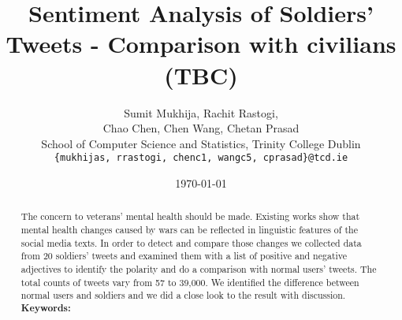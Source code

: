 \documentclass[english,a4paper,11pt]{article}
\title{Sentiment Analysis of Soldiers' Tweets - Comparison with civilians (TBC)}
\date{\today}
\author{
  Sumit Mukhija, Rachit Rastogi,\\
  Chao Chen, Chen Wang, Chetan Prasad\\
  School of Computer Science and Statistics, Trinity College Dublin\\
  \texttt{\{mukhijas, rrastogi, chenc1, wangc5, cprasad\}@tcd.ie}
}
\begin{document}
\maketitle
\thispagestyle{empty}
\pagestyle{empty}

\begin{abstract}
  The concern to veterans' mental health should be made. Existing works show that
  mental health changes caused by wars can be reflected in linguistic features of
  the social media texts. In order to detect and compare those changes we collected
  data from 20 soldiers' tweets and examined them with a list of positive and negative
  adjectives to identify the polarity and do a comparison with normal users'
  tweets. The total counts of tweets vary from 57 to 39,000. We identified the
  difference between normal users and soldiers and we did a close look to the
  result with discussion. \\
  \textbf{Keywords:}
\end{abstract}








\clearpage



\end{document}
